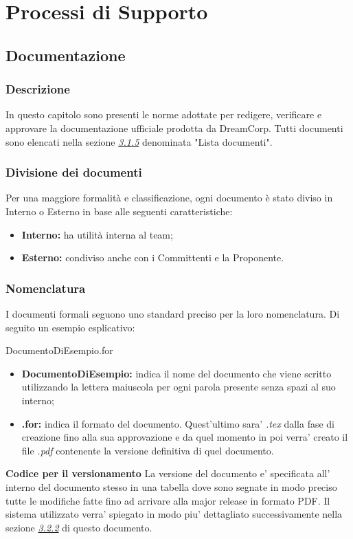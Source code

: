 \section{Processi di Supporto}

	\subsection{Documentazione}
		\subsubsection{Descrizione}
			In questo capitolo sono presenti le norme adottate per 					redigere, verificare e approvare la documentazione 						ufficiale prodotta da DreamCorp. Tutti documenti sono 					elencati nella sezione \hyperref[3.1.5]{\textit{3.1.5}} denominata "Lista documenti".
		\subsubsection{Divisione dei documenti}
			Per una maggiore formalità e classificazione, ogni 						documento è stato diviso in Interno o Esterno in base alle 				seguenti caratteristiche:
			\begin{itemize}
				\item \textbf{Interno:} ha utilità interna al team;
				\item \textbf{Esterno:} condiviso anche con i Committenti e la Proponente.
			\end{itemize}
		\subsubsection{Nomenclatura}
			I documenti formali seguono uno standard preciso per la 				loro nomenclatura. Di seguito un esempio esplicativo: 					\newline 
			\begin{center}
				DocumentoDiEsempio.for
			\end{center}
			\begin{itemize}
				\item \textbf{DocumentoDiEsempio:} indica il nome del documento che viene scritto utilizzando la lettera maiuscola per ogni parola presente senza spazi al suo interno;
				\item \textbf{.for:} indica il formato del documento. Quest'ultimo sara' \textit{.tex} dalla fase di creazione fino alla sua approvazione e da quel momento in poi verra' creato il file \textit{.pdf} contenente la versione definitiva di quel documento.
			\end{itemize}
			\textbf{Codice per il versionamento} La versione del documento e' specificata all' interno del documento stesso in una tabella dove sono segnate in modo preciso tutte le modifiche fatte fino ad arrivare alla major release in formato PDF. Il sistema utilizzato verra' spiegato in modo piu' dettagliato successivamente nella sezione \hyperref[3.2.2]{\textit{3.2.2}} di questo documento.
